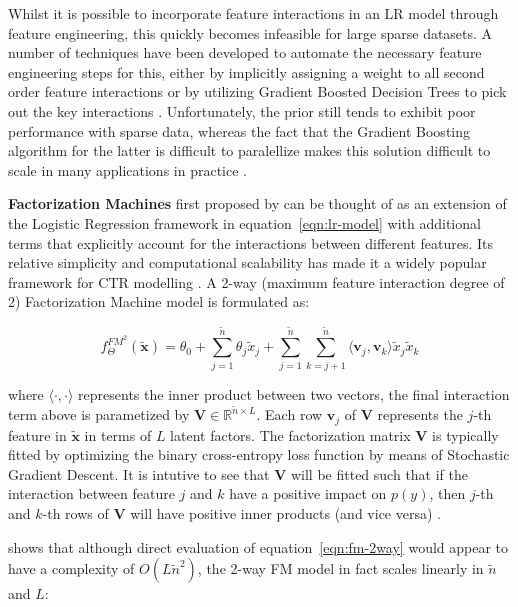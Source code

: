 \documentclass{mldsmsc}
\begin{document}
Whilst it is possible to incorporate feature interactions in an LR model through feature
engineering, this quickly becomes infeasible for large sparse datasets. A number of techniques
have been developed to automate the necessary feature engineering steps for this, either by
implicitly assigning a weight to all second order feature interactions \citep{RefWorks:chang2010training}
or by utilizing Gradient Boosted Decision Trees to pick out the key interactions \citep{RefWorks:cheng2014gradient}.
Unfortunately, the prior still tends to exhibit poor performance with sparse data, 
whereas the fact that the Gradient Boosting algorithm for the latter is difficult to paralellize
makes this solution difficult to scale in many applications in practice \citep{RefWorks:zhang2021deep}.

\textbf{Factorization Machines} first proposed by \cite{RefWorks:rendle2010factorization} can 
be thought of as an extension of the Logistic Regression framework in equation~\ref{eqn:lr-model}
with additional terms that explicitly account for the interactions between different features.
Its relative simplicity and computational scalability has made it a widely popular framework
for CTR modelling \citep{RefWorks:gu2021ad}. 
A 2-way (maximum feature interaction degree of 2) Factorization Machine model is formulated as:

\begin{equation}
\label{eqn:fm-2way}
f_{\Theta}^{FM^2}(\tilde{\mathbf{x}}) = \theta_0 + \sum_{j=1}^{\tilde{n}} \theta_{j} \tilde{x}_j
+ \sum_{j=1}^{\tilde{n}} \sum_{k=j+1}^{\tilde{n}} \langle \mathbf{v}_j , \mathbf{v}_k \rangle \tilde{x}_j \tilde{x}_k
\end{equation}

where $\langle \cdot , \cdot \rangle$ represents the inner product between two vectors, the final
interaction term above is parametized by $\mathbf{V} \in \mathbb{R}^{\tilde{n} \times L}$. Each
row $\mathbf{v}_j$ of $\mathbf{V}$ represents the $j$-th feature in $\tilde{\mathbf{x}}$ in terms
of $L$ latent factors. The factorization matrix $\mathbf{V}$ is typically fitted by optimizing
the binary cross-entropy loss function by means of Stochastic Gradient Descent. It is 
intutive to see that $\mathbf{V}$ will be fitted such that if the interaction
between feature $j$ and $k$ have a positive impact on $p(y)$, then $j$-th and 
$k$-th rows of $\mathbf{V}$ will have positive inner products (and vice versa) \citep{RefWorks:zhang2021deep}.

\cite{RefWorks:rendle2010factorization} shows that although direct evaluation
of equation~\ref{eqn:fm-2way} would appear to have a complexity of $O(L \tilde{n}^2)$, the 2-way
FM model in fact scales linearly in $\tilde{n}$ and $L$:
\end{document}
